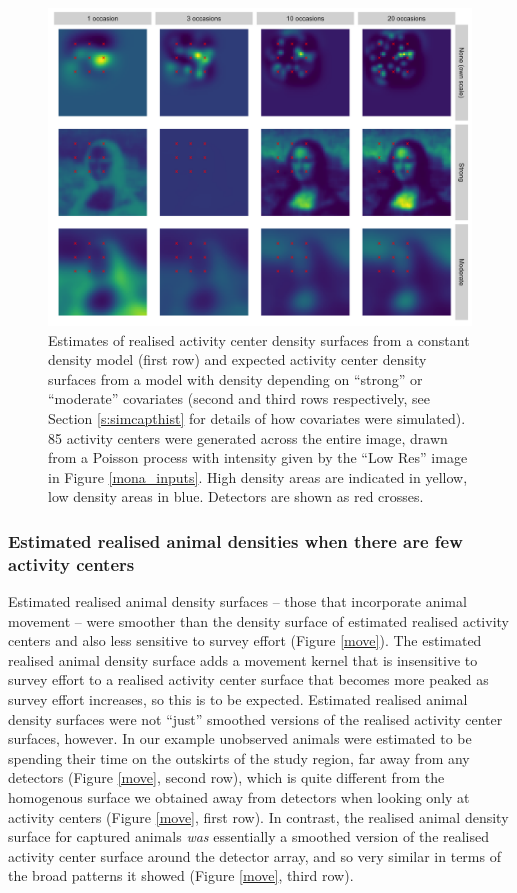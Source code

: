 \documentclass[10pt,a4paper]{article}
\begin{document}
\begin{figure}[htbp]
\centering
\includegraphics[width=1\textwidth]{mona_peaky.png}
\caption{Estimates of realised activity center density surfaces from a constant density model (first row) and expected activity center density surfaces from a model with density depending on ``strong'' or ``moderate'' covariates (second and third rows respectively, see Section \ref{s:simcapthist} for details of how covariates were simulated). 85 activity centers were generated across the entire image, drawn from a Poisson process with intensity given by the ``Low Res'' image in Figure \ref{mona_inputs}. High density areas are indicated in yellow, low density areas in blue. Detectors are shown as red crosses.}
\label{peaky}
\end{figure}

\subsubsection{Estimated realised animal densities when there are few activity centers}

Estimated realised animal density surfaces -- those that incorporate animal movement -- were smoother than the density surface of estimated realised activity centers and also less sensitive to survey effort (Figure \ref{move}). The estimated realised animal density surface adds a movement kernel that is insensitive to survey effort to a realised activity center surface that becomes more peaked as survey effort increases, so this is to be expected. Estimated realised animal density surfaces were not ``just'' smoothed versions of the realised activity center surfaces, however. In our example unobserved animals were estimated to be spending their time on the outskirts of the study region, far away from any detectors (Figure \ref{move}, second row), which is quite different from the homogenous surface we obtained away from detectors when looking only at activity centers (Figure \ref{move}, first row). In contrast, the realised animal density surface for captured animals {\it was} essentially a smoothed version of the realised activity center surface around the detector array, and so very similar in terms of the broad patterns it showed (Figure \ref{move}, third row).
\end{document}
